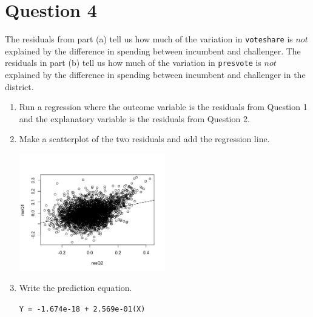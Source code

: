 \documentclass[12pt,letterpaper]{article}
\begin{document}
\section*{Question 4}
\noindent The residuals from part (a) tell us how much of the variation in \texttt{voteshare} is $not$ explained by the difference in spending between incumbent and challenger. The residuals in part (b) tell us how much of the variation in \texttt{presvote} is $not$ explained by the difference in spending between incumbent and challenger in the district.
	\begin{enumerate}
		\item Run a regression where the outcome variable is the residuals from Question 1 and the explanatory variable is the residuals from Question 2.	
			
		\vspace{1cm}
		\item Make a scatterplot of the two residuals and add the regression line. 
		
		\includegraphics[width=0.5\textwidth]{Q4_Rplot.png}
		\vspace{1cm}
		\item Write the prediction equation.
		
		\texttt{Y = -1.674e-18 + 2.569e-01(X)}
	\end{enumerate}
	
	\newpage	
\end{document}
